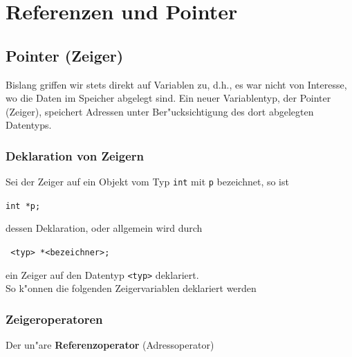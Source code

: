 \chapter{Referenzen und Pointer}
\label{p:6}


\section{Pointer (Zeiger)}
\label{p:6.2}

Bislang griffen wir stets direkt auf Variablen zu, d.h.,
es war nicht von Interesse, wo die Daten im Speicher
abgelegt sind.
Ein neuer Variablentyp, der Pointer (Zeiger), speichert
Adressen unter Ber"ucksichtigung des dort abgelegten Datentyps.
%
\subsection{Deklaration von Zeigern}
\label{p:6.2.1}
%
Sei der Zeiger auf ein Objekt vom Typ \verb|int| mit
\verb|p|  bezeichnet, so ist

\mbox{}\hfill\verb|int *p;|\hfill\mbox{}

dessen Deklaration, oder allgemein wird durch

%
\mbox{}\hfill\texttt{ <typ> *<bezeichner>;}\hfill\mbox{}

ein Zeiger auf den Datentyp \verb|<typ>| deklariert.
\\
So k"onnen  die folgenden Zeigervariablen deklariert werden
%
%


%
%
%
\subsection{Zeigeroperatoren}
\label{p:6.2.2}
%
Der un"are \textbf{Referenzoperator} (Adressoperator)


